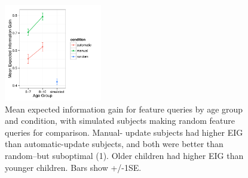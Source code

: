 \documentclass[10pt,letterpaper]{article}
\begin{document}
\begin{figure}[t]
  \centering
  \includegraphics[width=0.38\textwidth]{figures/EIG_by_ageGroup_n_condition}
  \caption{Mean expected information gain for feature queries by age group and condition, 
with simulated subjects making random feature queries for comparison. Manual-
update subjects had higher EIG than automatic-update subjects, and both were 
better than random--but suboptimal (1). Older children had higher EIG than younger children. Bars show +/-1SE.}
  \label{fig:EIG_by_age}
\end{figure} 






\end{document}
